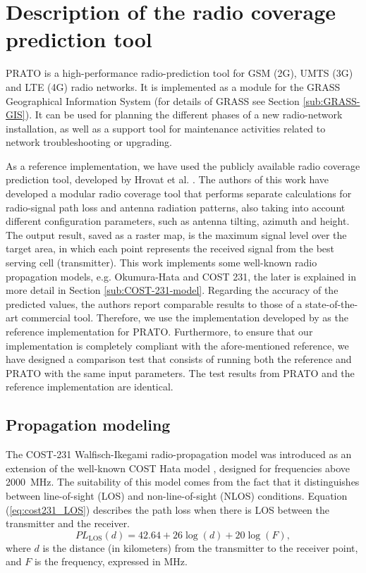 \section{Description of the radio coverage prediction tool \label{sec:Description-of-the-radio-coverage-prediction-tool}}

PRATO is a high-performance radio-prediction tool for GSM (2G), UMTS
(3G) and LTE (4G) radio networks. It is implemented as a module for
the GRASS Geographical Information System (for details of GRASS see
Section \ref{sub:GRASS-GIS}). It can be used for planning the different
phases of a new radio-network installation, as well as a support tool
for maintenance activities related to network troubleshooting or upgrading. 

As a reference implementation, we have used the publicly available
radio coverage prediction tool, developed by Hrovat et al. \cite{Ozimek_Open.source.radio.coverage.prediction:2010}.
The authors of this work have developed a modular radio coverage tool
that performs separate calculations for radio-signal path loss and
antenna radiation patterns, also taking into account different configuration
parameters, such as antenna tilting, azimuth and height. The output
result, saved as a raster map, is the maximum signal level over the
target area, in which each point represents the received signal from
the best serving cell (transmitter). This work implements some well-known
radio propagation models, e.g. Okumura-Hata and COST 231, the later
is explained in more detail in Section \ref{sub:COST-231-model}.
Regarding the accuracy of the predicted values, the authors report
comparable results to those of a state-of-the-art commercial tool.
Therefore, we use the implementation developed by \cite{Ozimek_Open.source.radio.coverage.prediction:2010}
as the reference implementation for PRATO. Furthermore, to ensure
that our implementation is completely compliant with the afore-mentioned
reference, we have designed a comparison test that consists of running
both the reference and PRATO with the same input parameters. The test
results from PRATO and the reference implementation are identical.


\subsection{Propagation modeling\label{sub:COST-231-model}}

The COST-231 Walfisch-Ikegami radio-propagation model was introduced
as an extension of the well-known COST Hata model \cite{Shabbir_Comparison_of_radio_propagation_models:2011,Sarkar_Survey_of_radio_propagation_models:2003},
designed for frequencies above 2000~MHz. The suitability of this
model comes from the fact that it distinguishes between line-of-sight
(LOS) and non-line-of-sight (NLOS) conditions. Equation (\ref{eq:cost231_LOS})
describes the path loss when there is LOS between the transmitter
and the receiver.
\begin{equation}
PL_{\textrm{LOS}}(d)=42.64+26\log(d)+20\log(F),\label{eq:cost231_LOS}
\end{equation}
where $d$ is the distance (in kilometers) from the transmitter to
the receiver point, and $F$ is the frequency, expressed in MHz.

